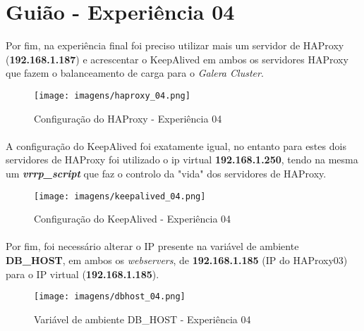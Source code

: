 \documentclass{report}
\begin{document}
\section{Guião - Experiência 04}
Por fim, na experiência final foi preciso utilizar mais um servidor de HAProxy (\textbf{192.168.1.187}) e acrescentar o KeepAlived em ambos os servidores HAProxy que fazem o balanceamento de carga para o \emph{Galera Cluster}.



\begin{figure}[H]
\center
\texttt{[image: imagens/haproxy\_04.png]}
\caption{Configuração do HAProxy - Experiência 04}
\label{fig.nav}
\end{figure}


\paragraph{}
A configuração do KeepAlived foi exatamente igual, no entanto para estes dois servidores de HAProxy foi utilizado o ip virtual \textbf{192.168.1.250}, tendo na mesma um \textbf{\emph{vrrp\_script}} que faz o controlo da "vida" dos servidores de HAProxy.

\begin{figure}[H]
\center
\texttt{[image: imagens/keepalived\_04.png]}
\caption{Configuração do KeepAlived - Experiência 04}
\label{fig.nav}
\end{figure}


\paragraph{}
Por fim, foi necessário alterar o IP presente na variável de ambiente \textbf{DB\_HOST}, em ambos os \emph{webservers},
de \textbf{192.168.1.185} (IP do HAProxy03) para o IP virtual (\textbf{192.168.1.185}).

\begin{figure}[H]
\center
\texttt{[image: imagens/dbhost\_04.png]}
\caption{Variável de ambiente DB\_HOST - Experiência 04}
\label{fig.nav}
\end{figure}
\end{document}
